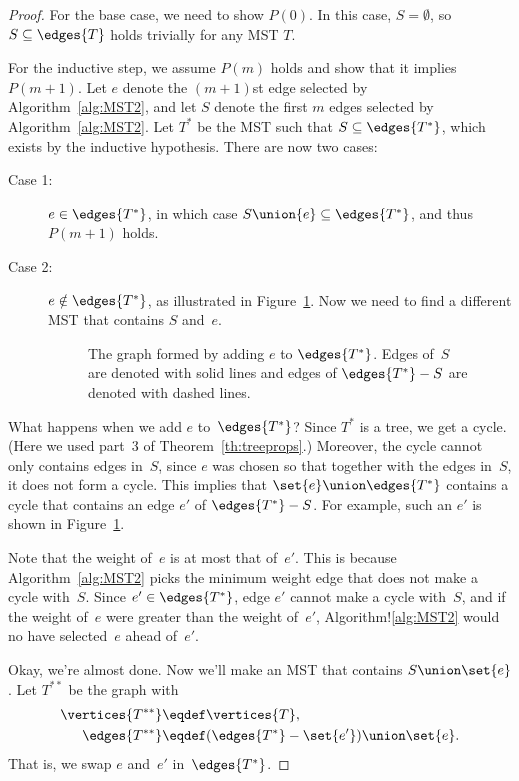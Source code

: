 \begin{proof}
For the base case, we need to show $P(0)$.  In this case, $S =
\emptyset$, so $S \subseteq \edges{T}$ holds trivially for any MST
$T$.

For the inductive step, we assume $P(m)$ holds and show that it
implies $P(m + 1)$.  Let $e$ denote the $(m+1)$st edge selected by
Algorithm~\ref{alg:MST2}, and let $S$ denote the first $m$ edges
selected by Algorithm~\ref{alg:MST2}.  Let $T^*$ be the
MST such that $S \subseteq \edges{T^*}$, which exists by the inductive
hypothesis.  There are now two cases:
\begin{description}

\item[Case 1:] $e \in \edges{T^*}$, in which case $S \union \{e\}
  \subseteq \edges{T^*}$, and thus $P(m+1)$ holds.

\item[Case 2:]
$e \notin \edges{T^*}$, as illustrated in Figure~\ref{fig:5KD}.  Now we need
  to find a different MST that contains $S$ and~$e$.

\begin{figure}


\caption{The graph formed by adding $e$ to $\edges{T^*}$.  Edges of~$S$ are
  denoted with solid lines and edges of $\edges{T^*} - S$ are denoted with
  dashed lines.}

\label{fig:5KD}
\end{figure}

\end{description}

What happens when we add $e$ to~$\edges{T^*}$?  Since $T^*$ is a tree,
we get a cycle.  (Here we used part~3 of Theorem~\ref{th:treeprops}.)
Moreover, the cycle cannot only contains edges in~$S$, since $e$ was
chosen so that together with the edges in~$S$, it does not form a
cycle.  This implies that $\set{e} \union \edges{T^*}$ contains a
cycle that contains an edge $e'$ of $\edges{T^*} - S$.  For example,
such an $e'$ is shown in Figure~\ref{fig:5KD}.

Note that the weight of~$e$ is at most that of~$e'$.  This is because
Algorithm~\ref{alg:MST2} picks the minimum weight edge that does not
make a cycle with~$S$.  Since $e' \in \edges{T^*}$, edge $e'$ cannot
make a cycle with~$S$, and if the weight of~$e$ were greater than the
weight of~$e'$, Algorithm!\ref{alg:MST2} would no have selected~$e$
ahead of~$e'$.

Okay, we're almost done.  Now we'll make an MST that contains $S
\union \set{e}$.  Let $T^{**}$ be the graph with
\begin{align*}
\vertices{T^{**}} & \eqdef \vertices{T},\\
\edges{T^{**}} & \eqdef (\edges{T^*} - \set{e'}) \union \set{e}.
\end{align*}
That is, we swap $e$ and~$e'$ in~$\edges{T^*}$.


\end{proof}
